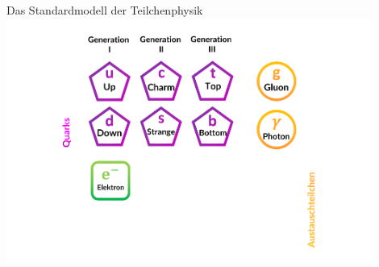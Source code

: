 \begin{frame}{Das Standardmodell der Teilchenphysik}
    \includegraphics[width=0.9\textwidth]{Figures Introductory Lecture/Standard Model/SM2_1.png}
\end{frame}





